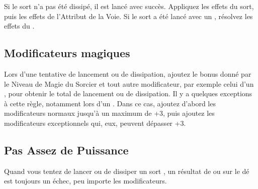 Si le sort n'a pas été dissipé, il est lancé avec succès. Appliquez les effets du sort, puis les effets de l'Attribut de la Voie. Si le sort a été lancé avec un \overwhelmingpower{}, résolvez les effets du \miscast{}.

\newpage
\subsection{Modificateurs magiques}
\label{magic_modifiers}

Lors d'une tentative de lancement ou de dissipation, ajoutez le bonus donné par le Niveau de Magie du Sorcier et tout autre modificateur, par exemple celui d'un \overwhelmingpower{}, pour obtenir le total de lancement ou de dissipation.  Il y a quelques exceptions à cette règle, notamment lors d'un \overwhelmingpower{}. Dans ce cas, ajoutez d'abord les modificateurs normaux jusqu'à un maximum de +3, puis ajoutez les modificateurs exceptionnels qui, eux, peuvent dépasser +3.

\subsection{\lostfocus}


\subsection{Pas Assez de Puissance}

Quand vous tentez de lancer ou de dissiper un sort , un résultat de  ou  sur le dé est toujours un échec, peu importe les modificateurs.


\subsection{\overwhelmingpower}


